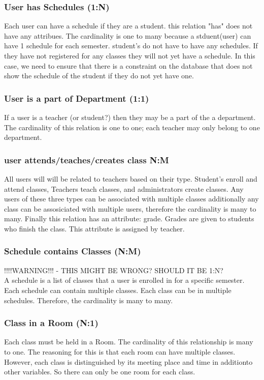 \documentclass[11pt,oneside,a4paper]{article}
\begin{document}
\subsubsection{User has Schedules (1:N)}
Each user can have a schedule if they are a student.  this relation "has" does not have
 any attribues. The cardinality is one to many because a stduent(user) can have 1 
schedule for each semester. student's do not have to have any schedules.  If they have not
 registered for any classes they will not yet have a schedule.  In this case, we need to 
ensure that there is a constraint on the database that does not show the schedule of the 
student if they do not yet have one.  
\subsubsection{User is a part of Department (1:1)}
If a user is a teacher (or student?) then they may be a part of the a department.
 The cardinality of this relation is one to one; each teacher may only belong to 
one department.
\subsubsection{user attends/teaches/creates class N:M}
All users will will be related to teachers based on their type.  Student's enroll and 
attend classes, Teachers teach classes, and administrators create classes.  Any users 
of these three types can be associated with multiple classes additionally any class 
can be assosiciated with multiple users, therefore the cardinality is many to many. 
Finally this relation has an attribute: grade.  Grades are given to students who 
finish the class. This attribute is assigned by teacher.
\subsubsection{Schedule contains Classes (N:M)}
!!!!WARNING!!! - THIS MIGHT BE WRONG? SHOULD IT BE 1:N?
\\
A schedule is a list of classes that a user is enrolled in for a specific semester.  Each schedule can contain multiple classes.  Each class can be in multiple schedules. Therefore, the cardinality is many to many. 
\subsubsection{Class in a Room (N:1)}
Each class must be held in a Room.  The cardinality of this relationship is many to one.  The reasoning for this is that each room can have multiple classes. However, each class is distinguished by its meeting place and time in additionto other variables.  So there can only be one room for each class.  
\end{document}
